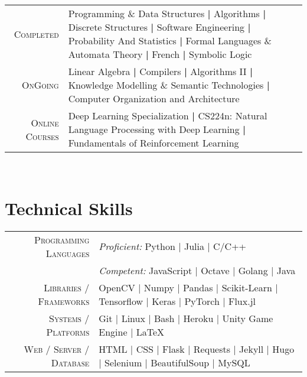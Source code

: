 \documentclass[a4paper,10pt]{extarticle} %
\begin{document}

\begin{tabular}{r|p{14.75cm}}
\textsc{Completed} & Programming \& Data Structures \textbf{|} Algorithms \textbf{|} Discrete Structures \textbf{|}  Software Engineering \textbf{|} Probability And Statistics \textbf{|} Formal Languages \& Automata Theory \textbf{|} French \textbf{|} Symbolic Logic \\
\textsc{OnGoing} & Linear Algebra  \textbf{|} Compilers \textbf{|} Algorithms II \textbf{|} Knowledge Modelling \& Semantic Technologies \textbf{|}  Computer Organization and Architecture \\
\textsc{Online Courses} & Deep Learning Specialization \textbf{|} CS224n: Natural Language Processing with Deep Learning \textbf{|} Fundamentals of Reinforcement Learning\\
\end{tabular}
\\




\section{\textcolor{primary}{Technical Skills}}

\begin{tabular}{r|p{15cm}}
\textsc{Programming Languages} & \textit{Proficient:} Python | Julia | C/C++ \\
                               & \textit{Competent:} JavaScript | Octave | Golang | Java \\
\textsc{Libraries / Frameworks} & OpenCV | Numpy | Pandas | Scikit-Learn | Tensorflow | Keras | PyTorch | Flux.jl \\
\textsc{Systems / Platforms} & Git | Linux | Bash | Heroku | Unity Game Engine | \LaTeX\\
\textsc{Web / Server / Database} & HTML | CSS | Flask | Requests | Jekyll | Hugo | Selenium | BeautifulSoup | MySQL \\
\end{tabular}
\\
\\
\end{document}
